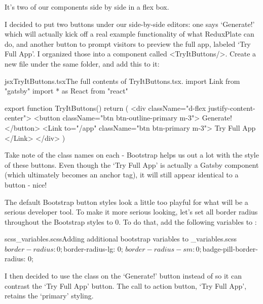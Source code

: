 \documentclass[paper=6in:9in,pagesize=pdftex,headinclude=on,footinclude=on,12pt,twoside]{scrbook}
\begin{document}
It's two of our  components side by side in a flex box. 


I decided to put two buttons under our side-by-side editors: one says `Generate!' which will actually kick off a real example functionality of what ReduxPlate can do, and another button to prompt visitors to preview the full app, labeled `Try Full App'. I organized those into a component called <TryItButtons/>. Create a new file  under the same  folder, and add this to it:

\begin{codeInput}{jsx}{TryItButtons.tsx}{The full contents of TryItButtons.tsx.}
import { Link } from "gatsby"
import * as React from "react"

export function TryItButtons() {
  return (
    <div className="d-flex justify-content-center">
      <button className="btn btn-outline-primary m-3">
        Generate!
      </button>
      <Link to="/app" className="btn btn-primary m-3">
        Try Full App
      </Link>
    </div>
  )
}  
\end{codeInput}

Take note of the class names on each - Bootstrap helps us out a lot with the style of these buttons. Even though the `Try Full App' is actually a Gatsby  component (which ultimately becomes an anchor tag), it will still appear identical to a button - nice! 


The default Bootstrap button styles look a little too playful for what will be a serious developer tool. To make it more serious looking, let's set all border radius throughout the Bootstrap styles to 0. To do that, add the following variables to :

\begin{codeInput}{scss}{\_variables.scss}{Adding additional bootstrap variables to \_variables.scss}
$border-radius: 0;
$border-radius-lg: 0;
$border-radius-sm: 0;
$badge-pill-border-radius: 0;
\end{codeInput}

I then decided to use the class  on the `Generate!' button instead of  so it can contrast the `Try Full App' button. The call to action button, `Try Full App', retains the `primary' styling. 
\end{document}
